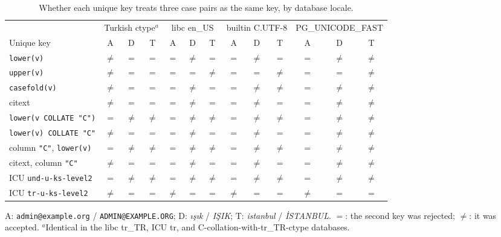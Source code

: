 \begin{table}[t]
\centering\small
\setlength{\tabcolsep}{3pt}
\caption{Whether each unique key treats three case pairs as the same key, by database locale.}
\label{tab:turkish}
\begin{tabular}{@{}lcccccccccccc@{}}
\toprule
 & \multicolumn{3}{c}{Turkish ctype$^{a}$} & \multicolumn{3}{c}{libc en\_US} & \multicolumn{3}{c}{builtin C.UTF-8} & \multicolumn{3}{c}{PG\_UNICODE\_FAST} \\
\cmidrule(lr){2-4}\cmidrule(lr){5-7}\cmidrule(lr){8-10}\cmidrule(lr){11-13}
Unique key & A & D & T & A & D & T & A & D & T & A & D & T \\
\midrule
\texttt{lower(v)} & $\neq$ & $=$ & $=$ & $=$ & $\neq$ & $=$ & $=$ & $\neq$ & $=$ & $=$ & $\neq$ & $\neq$ \\
\texttt{upper(v)} & $\neq$ & $=$ & $=$ & $=$ & $=$ & $\neq$ & $=$ & $=$ & $\neq$ & $=$ & $=$ & $\neq$ \\
\texttt{casefold(v)} & $\neq$ & $=$ & $=$ & $=$ & $\neq$ & $=$ & $=$ & $\neq$ & $\neq$ & $=$ & $\neq$ & $\neq$ \\
citext & $\neq$ & $=$ & $=$ & $=$ & $\neq$ & $=$ & $=$ & $\neq$ & $=$ & $=$ & $\neq$ & $\neq$ \\
\texttt{lower(v COLLATE "C")} & $=$ & $\neq$ & $\neq$ & $=$ & $\neq$ & $\neq$ & $=$ & $\neq$ & $\neq$ & $=$ & $\neq$ & $\neq$ \\
\texttt{lower(v) COLLATE "C"} & $\neq$ & $=$ & $=$ & $=$ & $\neq$ & $=$ & $=$ & $\neq$ & $=$ & $=$ & $\neq$ & $\neq$ \\
column \texttt{"C"}, \texttt{lower(v)} & $=$ & $\neq$ & $\neq$ & $=$ & $\neq$ & $\neq$ & $=$ & $\neq$ & $\neq$ & $=$ & $\neq$ & $\neq$ \\
citext, column \texttt{"C"} & $\neq$ & $=$ & $=$ & $=$ & $\neq$ & $=$ & $=$ & $\neq$ & $=$ & $=$ & $\neq$ & $\neq$ \\
ICU \texttt{und-u-ks-level2} & $=$ & $\neq$ & $\neq$ & $=$ & $\neq$ & $\neq$ & $=$ & $\neq$ & $\neq$ & $=$ & $\neq$ & $\neq$ \\
ICU \texttt{tr-u-ks-level2} & $\neq$ & $=$ & $=$ & $\neq$ & $=$ & $=$ & $\neq$ & $=$ & $=$ & $\neq$ & $=$ & $=$ \\
\bottomrule
\end{tabular}

\smallskip\footnotesize
A: \texttt{admin@example.org} / \texttt{ADMIN@EXAMPLE.ORG}; D: \textit{ışık} / \textit{IŞIK}; T: \textit{istanbul} / \textit{İSTANBUL}. $=$: the second key was rejected; $\neq$: it was accepted. $^{a}$Identical in the libc tr\_TR, ICU tr, and C-collation-with-tr\_TR-ctype databases.
\end{table}
